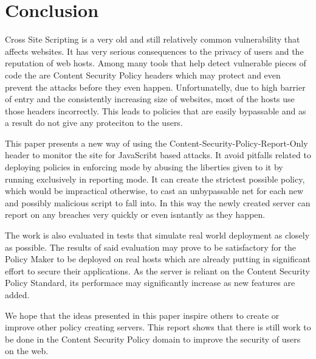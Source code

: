 \chapter{Conclusion}

Cross Site Scripting is a very old and still relatively common vulnerability that affects websites.
It has very serious consequences to the privacy of users and the reputation of web hosts.
Among many tools that help detect vulnerable pieces of code the are Content Security Policy headers which may protect and even prevent the attacks before they even happen.
Unfortunatelly, due to high barrier of entry and the consistently increasing size of websites, most of the hosts use those headers incorrectly.
This leads to policies that are easily bypassable and as a result do not give any proteciton to the users.

This paper presents a new way of using the Content-Security-Policy-Report-Only header to monitor the site for JavaScribt based attacks.
It avoid pitfalls related to deploying policies in enforcing mode by abusing the liberties given to it by running exclusively in reporting mode.
It can create the strictest possible policy, which would be impractical otherwise, to cast an unbypassable net for each new and possibly malicious script to fall into.
In this way the newly created server can report on any breaches very quickly or even isntantly as they happen.

The work is also evaluated in tests that simulate real world deployment as closely as possible.
The results of said evaluation may prove to be satisfactory for the Policy Maker to be deployed on real hosts which are already putting in significant effort to secure their applications.
As the server is reliant on the Content Security Policy Standard, its performace may significantly increase as new features are added.

We hope that the ideas presented in this paper inspire others to create or improve other policy creating servers.
This report shows that there is still work to be done in the Content Security Policy domain to improve the security of users on the web.
